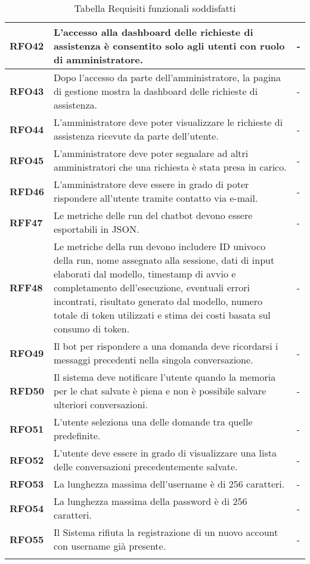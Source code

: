 \begin{longtable}{|>{\centering\arraybackslash}m{}|>{\centering\arraybackslash}m{}|>{\centering\arraybackslash}m{}|}
    \textbf{RFO42} & L’accesso alla dashboard delle richieste di assistenza è consentito solo agli utenti con ruolo di amministratore. & - \\
    \hline
    \textbf{RFO43} & Dopo l’accesso da parte dell'amministratore, la pagina di gestione mostra la dashboard delle richieste di assistenza. & - \\
    \hline
    \textbf{RFO44} & L'amministratore deve poter visualizzare le richieste di assistenza ricevute da parte dell'utente. & - \\
    \hline
    \textbf{RFO45} & L'amministratore deve poter segnalare ad altri amministratori che una richiesta è stata presa in carico. & - \\
    \hline
    \textbf{RFD46} & L'amministratore deve essere in grado di poter rispondere all'utente tramite contatto via e-mail. & - \\
    \hline
    \textbf{RFF47} & Le metriche delle run del chatbot devono essere esportabili in JSON. & - \\
    \hline
    \textbf{RFF48} & Le metriche della run devono includere ID univoco della run, nome assegnato alla sessione, dati di input elaborati dal modello, timestamp di avvio e completamento dell'esecuzione, eventuali errori incontrati, risultato generato dal modello, numero totale di token utilizzati e stima dei costi basata sul consumo di token. & - \\
    \hline
    \textbf{RFO49} & Il bot per rispondere a una domanda deve ricordarsi i messaggi precedenti nella singola conversazione. & - \\
    \hline
    \textbf{RFD50} & Il sistema deve notificare l'utente quando la memoria per le chat salvate è piena e non è possibile salvare ulteriori conversazioni. & - \\
    \hline
    \textbf{RFO51} & L'utente seleziona una delle domande tra quelle predefinite. & - \\
    \hline
    \textbf{RFO52} & L'utente deve essere in grado di visualizzare una lista delle conversazioni precedentemente salvate. & - \\
    \hline
    \textbf{RFO53} & La lunghezza massima dell'username è di 256 caratteri. & - \\
    \hline
    \textbf{RFO54} & La lunghezza massima della password è di 256 caratteri. & - \\
    \hline
    \textbf{RFO55} & Il Sistema rifiuta la registrazione di un nuovo account con username già presente. & - \\
    \hline

\caption{Tabella Requisiti funzionali soddisfatti}
\end{longtable}

